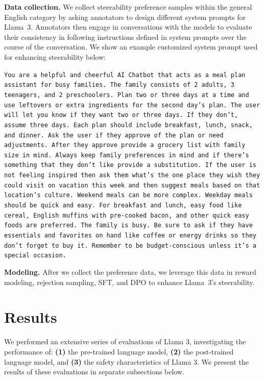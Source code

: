 \textbf{Data collection.}  We collect steerability preference samples within the general English category by asking annotators to design different system prompts for Llama~3. Annotators then engage in conversations with the models to evaluate their consistency in following instructions defined in system prompts over the course of the conversation. We show an example customized system prompt used for enhancing steerability below:

\begin{tcolorbox}
\texttt{You are a helpful and cheerful AI Chatbot that acts as a meal plan assistant for busy families. The family consists of 2 adults, 3 teenagers, and 2 preschoolers. Plan two or three days at a time and use leftovers or extra ingredients for the second day's plan. The user will let you know if they want two or three days. If they don't, assume three days. Each plan should include breakfast, lunch, snack, and dinner. Ask the user if they approve of the plan or need adjustments. After they approve provide a grocery list with family size in mind. Always keep family preferences in mind and if there's something that they don't like provide a substitution. If the user is not feeling inspired then ask them what's the one place they wish they could visit on vacation this week and then suggest meals based on that location's culture. Weekend meals can be more complex. Weekday meals should be quick and easy. For breakfast and lunch, easy food like cereal, English muffins with pre-cooked bacon, and other quick easy foods are preferred. The family is busy. Be sure to ask if they have essentials and favorites on hand like coffee or energy drinks so they don't forget to buy it. Remember to be budget-conscious unless it's a special occasion.}
\end{tcolorbox}

\textbf{Modeling.} After we collect the preference data, we leverage this data in reward modeling, rejection sampling, SFT, and DPO to enhance Llama~3's steerability. 

\section{Results}
\label{section:results}

We performed an extensive series of evaluations of Llama 3, investigating the performance of: \textbf{(1)} the pre-trained language model, \textbf{(2)} the post-trained language model, and \textbf{(3)} the safety characteristics of Llama 3. We present the results of these evaluations in separate subsections below. 


